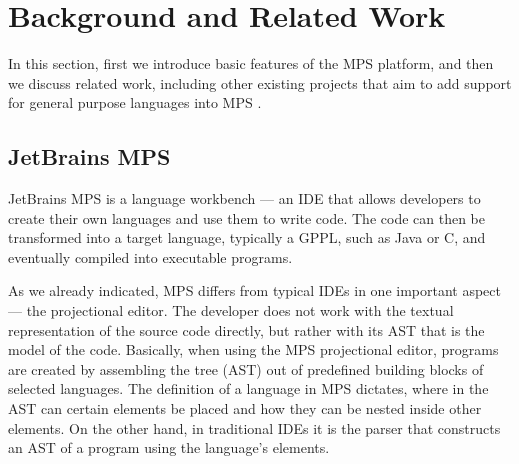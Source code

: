 \section{Background and Related Work}
\label{sect:BACKGRELWORK}

In this section, first we introduce basic features of the MPS platform, and then we discuss related work, including other existing projects that aim to add support for general purpose languages into MPS .

\subsection{JetBrains MPS}
\label{sect:MPS}




JetBrains MPS is a language workbench --- an IDE that allows developers to create their own languages and use them to write code.
The code can then be transformed into a target language, typically a GPPL, such as Java or C, and eventually compiled into executable programs.

As we already indicated, MPS differs from typical IDEs in one important aspect --- the projectional editor.
The developer does not work with the textual representation of the source code directly, but rather with its AST that is the model of the code.
Basically, when using the MPS projectional editor, programs are created by assembling the tree (AST) out of predefined building blocks of selected languages.
The definition of a language in MPS dictates, where in the AST can certain elements be placed and how they can be nested inside other elements.
On the other hand, in traditional IDEs it is the parser that constructs an AST of a program using the language's elements.

